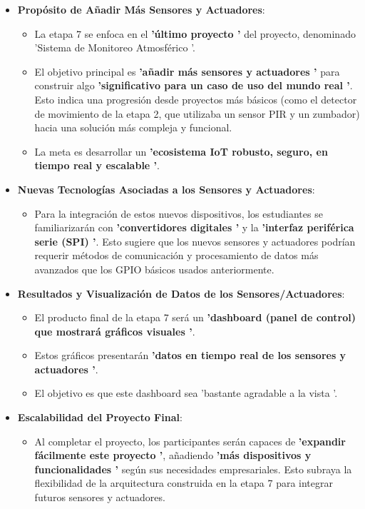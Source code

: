 \documentclass{report}
\begin{document}
\begin{itemize}
    \item \textbf{Propósito de Añadir Más Sensores y Actuadores}:
    \begin{itemize}
        \item La etapa 7 se enfoca en el \textbf{ 'último proyecto '} del proyecto, denominado  'Sistema de Monitoreo Atmosférico '.
        \item El objetivo principal es \textbf{ 'añadir más sensores y actuadores '} para construir algo \textbf{ 'significativo para un caso de uso del 
        mundo real '}. Esto indica una progresión desde proyectos más básicos (como el detector de movimiento de la etapa 2, que utilizaba un 
        sensor PIR y un zumbador) hacia una solución más compleja y funcional.
        \item La meta es desarrollar un \textbf{ 'ecosistema IoT robusto, seguro, en tiempo real y escalable '}.
    \end{itemize}
    \item \textbf{Nuevas Tecnologías Asociadas a los Sensores y Actuadores}:
    \begin{itemize}
        \item Para la integración de estos nuevos dispositivos, los estudiantes se familiarizarán con \textbf{ 'convertidores digitales '} y la 
        \textbf{ 'interfaz periférica serie (SPI) '}. Esto sugiere que los nuevos sensores y actuadores podrían requerir métodos de comunicación y 
        procesamiento de datos más avanzados que los GPIO básicos usados anteriormente.
    \end{itemize}
    \item \textbf{Resultados y Visualización de Datos de los Sensores/Actuadores}:
    \begin{itemize}
        \item El producto final de la etapa 7 será un \textbf{ 'dashboard (panel de control) que mostrará gráficos visuales '}.
        \item Estos gráficos presentarán \textbf{ 'datos en tiempo real de los sensores y actuadores '}.
        \item El objetivo es que este dashboard sea  'bastante agradable a la vista '.
    \end{itemize}
    \item \textbf{Escalabilidad del Proyecto Final}:
    \begin{itemize}
        \item Al completar el proyecto, los participantes serán capaces de \textbf{ 'expandir fácilmente este proyecto '}, añadiendo 
        \textbf{ 'más dispositivos y funcionalidades '} según sus necesidades empresariales. Esto subraya la flexibilidad de la arquitectura 
        construida en la etapa 7 para integrar futuros sensores y actuadores.
    \end{itemize}
\end{itemize}
\end{document}
